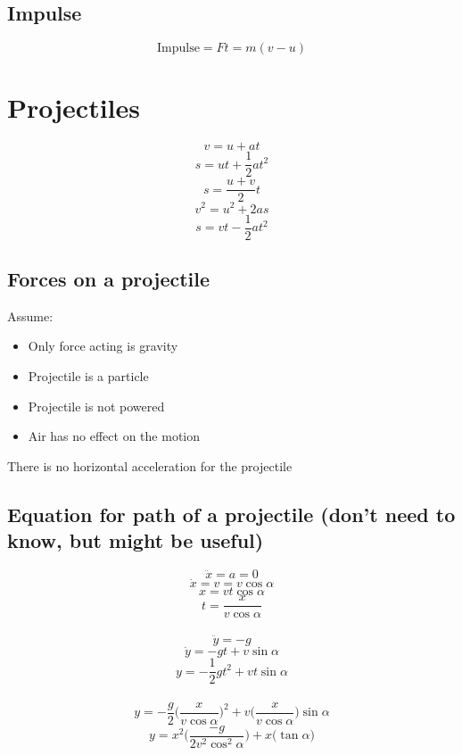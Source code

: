 \documentclass{article}[18pt]
\begin{document}
\subsection{Impulse}
$$\textrm{Impulse}=Ft=m(v-u)$$
\section{Projectiles}
$$v=u+at$$
$$s=ut+\frac{1}{2}at^2$$
$$s=\frac{u+v}{2}t$$
$$v^2=u^2+2as$$
$$s=vt-\frac{1}{2}at^2$$
\subsection{Forces on a projectile}
Assume:
\begin{itemize}
\item Only force acting is gravity
\item Projectile is a particle
\item Projectile is not powered
\item Air has no effect on the motion
\end{itemize}
There is no horizontal acceleration for the projectile
\subsection{Equation for path of a projectile (don't need to know, but might be useful)}
$$\ddot{x}=a=0$$
$$\dot{x}=v=v\cos\alpha$$
$$x=vt\cos\alpha$$
$$t=\frac{x}{v\cos\alpha}$$
\\
$$\ddot{y}=-g$$
$$\dot{y}=-gt+v\sin\alpha$$
$$y=-\frac{1}{2}gt^2+vt\sin\alpha$$
\\
$$y=-\frac{g}{2}\Bigg(\frac{x}{v\cos\alpha}\Bigg)^2+v\Bigg(\frac{x}{v\cos\alpha}\Bigg)\sin\alpha$$
$$y=x^2\Bigg(\frac{-g}{2v^2\cos^2\alpha}\Bigg)+x\Big(\tan\alpha\Big)$$
\end{document}
